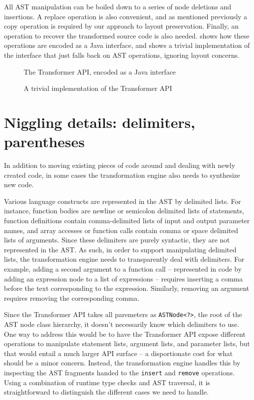 All AST manipulation can be boiled down to a series of node deletions and
insertions.  A replace operation is also convenient, and as mentioned
previously a copy operation is required by our approach to layout preservation.
Finally, an operation to recover the transformed source code is also needed.
 shows how these operations are encoded as a Java
interface, and  shows a trivial implementation of
the interface that just falls back on AST operations, ignoring layout concerns.

\begin{figure}

\caption{The Transformer API, encoded as a Java interface}
\label{Fig:TransformerAPI}
\end{figure}

\begin{figure}

\caption{A trivial implementation of the Transformer API}
\label{Fig:BasicTransformer}
\end{figure}

\section{Niggling details: delimiters, parentheses}

In addition to moving existing pieces of code around and dealing with newly
created code, in some cases the transformation engine also needs to synthesize
new code.

Various \matlab language constructs are represented in the AST by delimited
lists. For instance, function bodies are newline or semicolon delimited lists
of statements, function definitions contain comma-delimited lists of input and
output parameter names, and array accesses or function calls contain comma or
space delimited lists of arguments. Since these delimiters are purely
syntactic, they are not represented in the AST. As such, in order to support
manipulating delimited lists, the transformation engine needs to transparently
deal with delimiters. For example, adding a second argument to a function call
-- represented in code by adding an expression node to a list of expressions --
requires inserting a comma before the text corresponding to the expression.
Similarly, removing an argument requires removing the corresponding comma.

Since the Transformer API takes all paremeters as \texttt{ASTNode<?>}, the root
of the AST node class hierarchy, it doesn't necessarily know which delimiters
to use. One way to address this would be to have the Transformer API expose
different operations to manipulate statement lists, argument lists, and
parameter lists, but that would entail a much larger API surface -- a
disportionate cost for what should be a minor concern. Instead, the
transformation engine handles this by inspecting the AST fragments handed to
the \texttt{insert} and \texttt{remove} operations. Using a combination of
runtime type checks and AST traversal, it is straightforward to distinguish the
different cases we need to handle.

